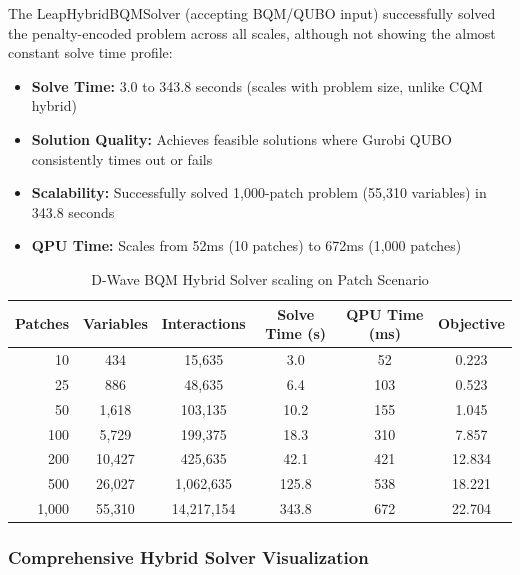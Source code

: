 The LeapHybridBQMSolver (accepting BQM/QUBO input) successfully solved the penalty-encoded problem across all scales, although not showing the almost constant solve time profile:

\begin{itemize}
    \item \textbf{Solve Time:} 3.0 to 343.8 seconds (scales with problem size, unlike CQM hybrid)
    \item \textbf{Solution Quality:} Achieves feasible solutions where Gurobi QUBO consistently times out or fails
    \item \textbf{Scalability:} Successfully solved 1,000-patch problem (55,310 variables) in 343.8 seconds
    \item \textbf{QPU Time:} Scales from 52ms (10 patches) to 672ms (1,000 patches)
\end{itemize}

\begin{table}[H]
\centering
\caption{D-Wave BQM Hybrid Solver scaling on Patch Scenario}
\label{tab:dwave_bqm_scaling}
\small
\begin{tabular}{rccccc}
\toprule
\textbf{Patches} & \textbf{Variables} & \textbf{Interactions} & \textbf{Solve Time (s)} & \textbf{QPU Time (ms)} & \textbf{Objective} \\
\midrule
10 & 434 & 15,635 & 3.0 & 52 & 0.223 \\
25 & 886 & 48,635 & 6.4 & 103 & 0.523 \\
50 & 1,618 & 103,135 & 10.2 & 155 & 1.045 \\
100 & 5,729 & 199,375 & 18.3 & 310 & 7.857 \\
200 & 10,427 & 425,635 & 42.1 & 421 & 12.834 \\
500 & 26,027 & 1,062,635 & 125.8 & 538 & 18.221 \\
1,000 & 55,310 & 14,217,154 & 343.8 & 672 & 22.704 \\
\bottomrule
\end{tabular}
\end{table}


\subsubsection{Comprehensive Hybrid Solver Visualization}

